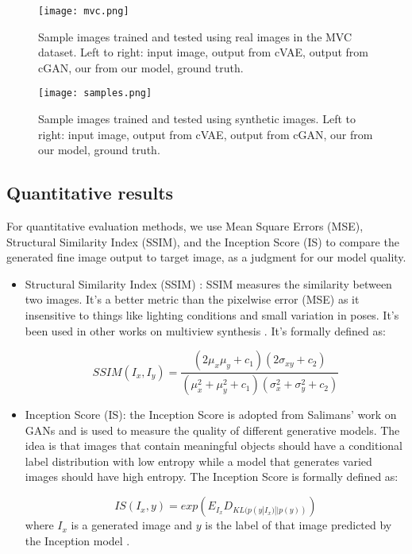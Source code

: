 \documentclass[10pt,conference]{IEEEtran}
\begin{document}
\begin{figure}[htbp]
\centering
\texttt{[image: mvc.png]}
\caption{Sample images trained and tested using real images in the MVC dataset. Left to right: input image, output from cVAE, output from cGAN, our from our model, ground truth.}
\end{figure}

\begin{figure}[htbp]
\centering
\texttt{[image: samples.png]}
\caption{Sample images trained and tested using synthetic images. Left to right: input image, output from cVAE, output from cGAN, our from our model, ground truth.}
\end{figure}

\subsection{Quantitative results}

For quantitative evaluation methods, we use Mean Square Errors (MSE), Structural Similarity Index (SSIM), and the Inception Score (IS) to compare the generated fine image output to target image, as a judgment for our model quality.

\begin{itemize}
\item Structural Similarity Index (SSIM) \autocite{wang2004image}: SSIM measures the similarity between two images. It's a better metric than the pixelwise error (MSE) as it insensitive to things like lighting conditions and small variation in poses. It's been used in other works on multiview synthesis \autocite{park2017transformation, zhao2017multi}. It's formally defined as:

$$SSIM(I_x,I_y)=\frac{(2\mu_x \mu_y + c_1)(2\sigma_{xy}+c_2)}{(\mu_x^2+\mu_y^2 +c_1)(\sigma_x^2+\sigma_y^2+c_2)}$$

\item Inception Score (IS): the Inception Score is adopted from Salimans' work on GANs \autocite{salimans2016improved} and is used to measure the quality of different generative models. The idea is that images that contain meaningful objects should have a conditional label distribution with low entropy while a model that generates varied images should have high entropy. The Inception Score is formally defined as:

$$IS(I_x, y)=exp(E_{I_x}D_{KL(p(y|I_x) || p(y))})$$
where $I_x$ is a generated image and $y$ is the label of that image predicted by the Inception model \autocite{szegedy2015going}.

\end{itemize}
\end{document}

